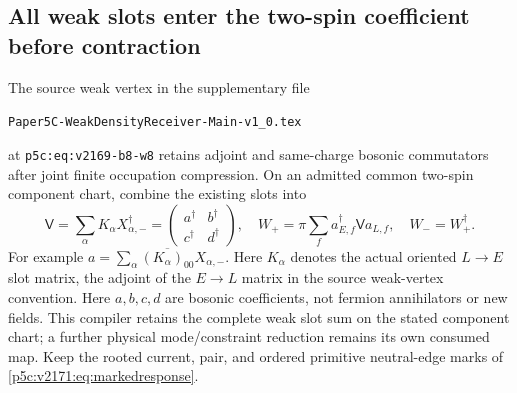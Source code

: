 \documentclass[12pt,a4paper]{article}
\begin{document}
\subsection{All weak slots enter the two-spin coefficient before contraction}
The source weak vertex in the supplementary file
\begin{center}
\small\nolinkurl{Paper5C-WeakDensityReceiver-Main-v1_0.tex}
\end{center}
\noindent at \texttt{p5c:eq:v2169-b8-w8} retains adjoint and
same-charge bosonic commutators after joint finite occupation compression. On an admitted
common two-spin component chart, combine the existing slots into
\begin{equation}
 \mathsf V=\sum_\alpha K_\alpha X_{\alpha,-}^\dagger
 =\begin{pmatrix}a^\dagger&b^\dagger\\c^\dagger&d^\dagger\end{pmatrix},
 \quad W_+=\pi\sum_f a_{E,f}^\dagger\mathsf V a_{L,f},
 \quad W_-=W_+^\dagger.
 \label{p5c:v2171:eq:matrixweak}
\end{equation}
For example $a=\sum_\alpha\overline{(K_\alpha)_{00}}X_{\alpha,-}$.
Here $K_\alpha$ denotes the actual oriented $L\to E$ slot matrix, the
adjoint of the $E\to L$ matrix in the source weak-vertex convention.
Here $a,b,c,d$ are bosonic coefficients, not fermion annihilators or new
fields. This compiler retains the complete weak slot sum on the stated
component chart; a further physical mode/constraint reduction remains its
own consumed map. Keep the rooted current, pair, and ordered primitive
neutral-edge marks of \eqref{p5c:v2171:eq:markedresponse}.
\end{document}
